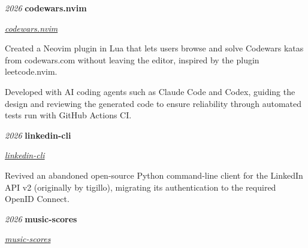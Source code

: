 \documentclass{cv}
\begin{document}
        \vspace{0.13 cm}

        \begin{twocolentry}{
        \textit{2026}}
            \textbf{codewars.nvim}

            \textit{\href{https://github.com/prosk-sudo/codewars.nvim}{codewars.nvim}}
        \end{twocolentry}

        \vspace{0.10 cm}
        \begin{onecolentry}
            \begin{highlights}
                \item Created a Neovim plugin in Lua that lets users browse and solve Codewars katas from codewars.com without leaving the editor, inspired by the plugin leetcode.nvim.
                \item Developed with AI coding agents such as Claude Code and Codex, guiding the design and reviewing the generated code to ensure reliability through automated tests run with GitHub Actions CI.
            \end{highlights}
        \end{onecolentry}

        \vspace{0.13 cm}

        \begin{twocolentry}{
        \textit{2026}}
            \textbf{linkedin-cli}

            \textit{\href{https://github.com/prosk-sudo/linkedin-cli}{linkedin-cli}}
        \end{twocolentry}

        \vspace{0.10 cm}
        \begin{onecolentry}
            \begin{highlights}
                \item Revived an abandoned open-source Python command-line client for the LinkedIn API v2 (originally by tigillo), migrating its authentication to the required OpenID Connect.
            \end{highlights}
        \end{onecolentry}

        \vspace{0.13 cm}

        \begin{twocolentry}{
        \textit{2026}}
            \textbf{music-scores}

            \textit{\href{https://github.com/prosk-sudo/music-scores}{music-scores}}
        \end{twocolentry}
\end{document}
